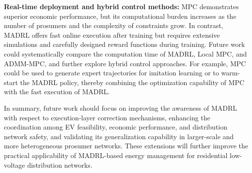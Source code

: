 \textbf{Real-time deployment and hybrid control methods:} MPC demonstrates superior economic performance, but its computational burden increases as the number of prosumers and the complexity of constraints grow. In contrast, MADRL offers fast online execution after training but requires extensive simulations and carefully designed reward functions during training. Future work could systematically compare the computation time of MADRL, Local MPC, and ADMM-MPC, and further explore hybrid control approaches. For example, MPC could be used to generate expert trajectories for imitation learning or to warm-start the MADRL policy, thereby combining the optimization capability of MPC with the fast execution of MADRL.

In summary, future work should focus on improving the awareness of MADRL with respect to execution-layer correction mechanisms, enhancing the coordination among EV feasibility, economic performance, and distribution network safety, and validating its generalization capability in larger-scale and more heterogeneous prosumer networks. These extensions will further improve the practical applicability of MADRL-based energy management for residential low-voltage distribution networks.
